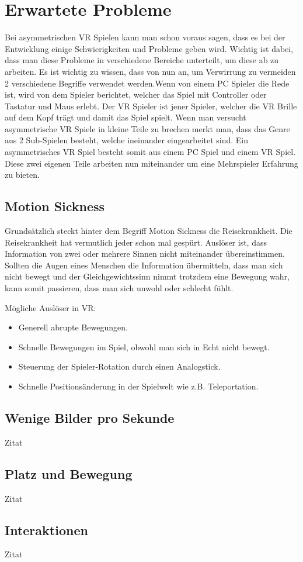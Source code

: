\section{Erwartete Probleme}
Bei asymmetrischen VR Spielen kann man schon voraus sagen, dass es bei der Entwicklung einige Schwierigkeiten und Probleme geben wird. Wichtig ist dabei, dass man diese Probleme in verschiedene Bereiche unterteilt, um diese ab zu arbeiten. Es ist wichtig zu wissen, dass von nun an, um Verwirrung zu vermeiden 2 verschiedene Begriffe verwendet werden.Wenn von einem PC Spieler die Rede ist, wird von dem Spieler berichtet, welcher das Spiel mit Controller oder Tastatur und Maus erlebt. Der VR Spieler ist jener Spieler, welcher die VR Brille auf dem Kopf trägt und damit das Spiel spielt. Wenn man versucht asymmetrische VR Spiele in kleine Teile zu brechen merkt man, dass das Genre aus 2 Sub-Spielen besteht, welche ineinander eingearbeitet sind. Ein asymmetrisches VR Spiel besteht somit aus einem PC Spiel und einem VR Spiel. Diese zwei eigenen Teile arbeiten nun miteinander um eine Mehrspieler Erfahrung zu bieten.

\subsection{Motion Sickness}
Grundsätzlich steckt hinter dem Begriff Motion Sickness die Reisekrankheit. Die Reisekrankheit hat vermutlich jeder schon mal gespürt. Auslöser ist, dass Information von zwei oder mehrere Sinnen nicht miteinander übereinstimmen. Sollten die Augen eines Menschen die Information übermitteln, dass man sich nicht bewegt und der Gleichgewichtssinn nimmt trotzdem eine Bewegung wahr, kann somit passieren, dass man sich unwohl oder schlecht fühlt.

\vspace{4cm}

Mögliche Auslöser in VR:
\begin{itemize}
\item Generell abrupte Bewegungen.
\item Schnelle Bewegungen im Spiel, obwohl man sich in Echt nicht bewegt.
\item Steuerung der Spieler-Rotation durch einen Analogstick.
\item Schnelle Positionsänderung in der Spielwelt wie z.B. Teleportation.
\end{itemize}


\subsection{Wenige Bilder pro Sekunde}
Zitat

\subsection{Platz und Bewegung}
Zitat

\subsection{Interaktionen}
Zitat